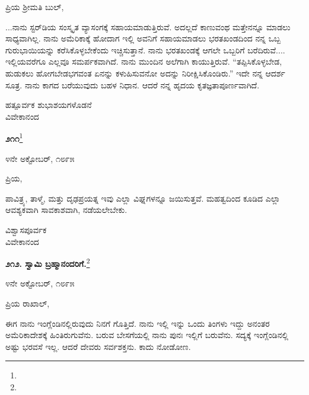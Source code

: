 \noindent
ಪ್ರಿಯ ಶ‍್ರೀಮತಿ ಬುಲ್,

...ನಾನು ಸ್ಟರ್‌ಡಿಯ ಸಂಸ್ಕೃತ ವ್ಯಾಸಂಗಕ್ಕೆ ಸಹಾಯಮಾಡುತ್ತಿರುವೆ. ಅದಲ್ಲದೆ ಕಾಣುವಂಥ ಮತ್ತೇನನ್ನೂ ಮಾಡಲು ಸಾಧ್ಯವಾಗಿಲ್ಲ. ನಾನು ಅಮೆರಿಕಾಕ್ಕೆ ಹೋದಾಗ ಇಲ್ಲಿ ಅವನಿಗೆ ಸಹಾಯಮಾಡಲು ಭರತಖಂಡದಿಂದ ನನ್ನ ಒಬ್ಬ ಗುರುಭಾಯಿಯನ್ನು ಕರೆಸಿಕೊಳ್ಳಬೇಕೆಂದು ಇಚ್ಚಿಸುತ್ತಾನೆ. ನಾನು ಭರತಖಂಡಕ್ಕೆ ಆಗಲೇ ಒಬ್ಬರಿಗೆ ಬರೆದಿರುವೆ.... ಇಲ್ಲಿಯವರೆಗೂ ಎಲ್ಲವೂ ಸಮರ್ಪಕವಾಗಿದೆ. ನಾನು ಮುಂದಿನ ಅಲೆಗಾಗಿ ಕಾಯುತ್ತಿರುವೆ. “ತಪ್ಪಿಸಿಕೊಳ್ಳಬೇಡ, ಹುಡುಕಲು ಹೋಗಬೇಡ\enginline{-}ಭಗವಂತ ಏನನ್ನು ಕಳುಹಿಸುವನೋ ಅದನ್ನು ನಿರೀಕ್ಷಿಸಿಕೊಂಡಿರು.” ಇದೇ ನನ್ನ ಆದರ್ಶ ಸೂತ್ರ. ನಾನು ಕಾಗದ ಬರೆಯುವುದು ಬಹಳ ನಿಧಾನ. ಆದರೆ ನನ್ನ ಹೃದಯ ಕೃತಜ್ಞತಾಪೂರ್ಣವಾಗಿದೆ.

\vspace{-0.4cm}

{\flushright
ಹತ್ಪೂರ್ವಕ ಶುಭಾಶಯಗಳೊಡನೆ\\ವಿವೇಕಾನಂದ\par}
\vspace{-0.5cm}

\begin{center}
\textbf{೨೧೧}\footnote{}
\end{center}

\vspace{-0.7cm}

\begin{flushright}
೪ನೇ ಅಕ್ಟೋಬರ್, ೧೮೯೫
\end{flushright}

\vspace{-0.4cm}

\noindent
ಪ್ರಿಯ,

ಪಾವಿತ್ರ್ಯ, ತಾಳ್ಮೆ, ಮತ್ತು ದೃಢಪ್ರಯತ್ನ\enginline{-} ಇವು ಎಲ್ಲಾ ವಿಘ್ನಗಳನ್ನೂ ಜಯಿಸುತ್ತವೆ. ಮಹತ್ವದಿಂದ ಕೂಡಿದ ಎಲ್ಲಾ ಆವಶ್ಯಕವಾಗಿ ಸಾವಕಾಶವಾಗಿ, ನಡೆಯಲೇಬೇಕು.

\vspace{-0.3cm}

{\flushright
ವಿಶ್ವಾಸಪೂರ್ವಕ\\ವಿವೇಕಾನಂದ\par}

\begin{center}
\textbf{೨೧೨. ಸ್ವಾಮಿ ಬ್ರಹ್ಮಾನಂದರಿಗೆ.}\footnote{}
\end{center}

\vspace{-0.5cm}

\begin{flushright}
೪ನೇ ಅಕ್ಟೋಬರ್, ೧೮೯೫
\end{flushright}

\noindent
ಪ್ರಿಯ ರಾಖಾಲ್,

ಈಗ ನಾನು ಇಂಗ್ಲೆಂಡಿನಲ್ಲಿರುವುದು ನಿನಗೆ ಗೊತ್ತಿದೆ. ನಾನು ಇಲ್ಲಿ ಇನ್ನು ಒಂದು ತಿಂಗಳು ಇದ್ದು ಅನಂತರ ಅಮೆರಿಕಾದೇಶಕ್ಕೆ ಹಿಂತಿರುಗುವೆನು. ಬರುವ ಬೇಸಗೆಯಲ್ಲಿ ನಾನು ಪುನಃ ಇಲ್ಲಿಗೆ ಬರುವೆನು. ಸದ್ಯಕ್ಕೆ ಇಂಗ್ಲೆಂಡಿನಲ್ಲಿ ಅಷ್ಟು ಭರವಸೆ ಇಲ್ಲ. ಆದರೆ ದೇವರು ಸರ್ವಶಕ್ತನು. ಕಾದು ನೋಡೋಣ.

